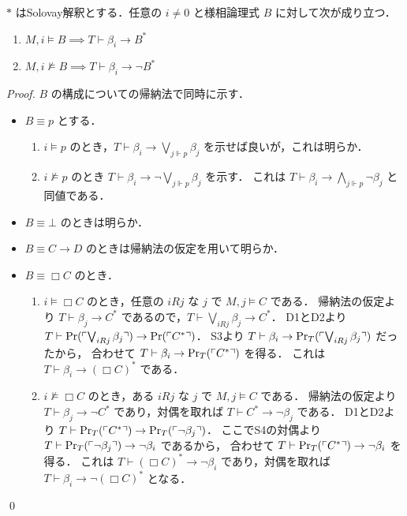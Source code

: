\documentclass{jsarticle}
\begin{document}
\begin{lemma}\label{lem:solovay_interpretation}
	$*$ はSolovay解釈とする．任意の $i \neq 0$ と様相論理式 $B$ に対して次が成り立つ．
	\begin{enumerate}
		\item $M, i \vDash B \implies T \vdash \beta_i \to B^*$
		\item $M, i \nvDash B \implies T \vdash \beta_i \to \lnot B^*$
	\end{enumerate}
\end{lemma}
\begin{proof}
	$B$ の構成についての帰納法で同時に示す．
	\begin{itemize}
		\item
		      $B \equiv p$ とする．
		      \begin{enumerate}
			      \item
			            $i \vDash p$ のとき，$T \vdash \beta_i \to \bigvee_{j \Vdash p} \beta_j $ を示せば良いが，これは明らか．
			      \item
			            $i \nvDash p$ のとき $T \vdash \beta_i \to \lnot \bigvee_{j \Vdash p} \beta_j$ を示す．
			            これは $T \vdash \beta_i \to \bigwedge_{j \Vdash p} \lnot \beta_j$ と同値である．
		      \end{enumerate}
		\item $B \equiv \bot$ のときは明らか．
		\item $B \equiv C \to D$ のときは帰納法の仮定を用いて明らか．
		\item
		      $B \equiv \Box C$ のとき．
		      \begin{enumerate}
			      \item
			            $i \vDash \Box C$ のとき，任意の $i R j$ な $j$ で $M, j \vDash C$ である．
			            帰納法の仮定より $T \vdash \beta_j \to C^*$ であるので，$T \vdash \bigvee_{i R j} \beta_j \to C^*$．
			            D1とD2より $T \vdash \mathrm{Pr}(\ulcorner \bigvee_{i R j} \beta_j \urcorner) \to \mathrm{Pr}(\ulcorner C^* \urcorner)$．
			            S3より $T \vdash \beta_i \to \mathrm{Pr}_T(\ulcorner \bigvee_{i R j} \beta_j \urcorner)$ だったから，
			            合わせて $T \vdash \beta_i \to \mathrm{Pr}_T(\ulcorner C^* \urcorner)$ を得る．
			            これは $T \vdash \beta_i \to (\Box C)^*$ である．
			      \item
			            $i \nvDash \Box C$ のとき，ある $i R j$ な $j$ で $M, j \vDash C$ である．
			            帰納法の仮定より $T \vdash \beta_j \to \lnot C^*$ であり，対偶を取れば $T \vdash C^* \to \lnot \beta_j$ である．
			            D1とD2より $T \vdash \mathrm{Pr}_T(\ulcorner C^* \urcorner) \to \mathrm{Pr}_T(\ulcorner \lnot \beta_j \urcorner)$．
			            ここでS4の対偶より $T \vdash \mathrm{Pr}_T(\ulcorner \lnot \beta_j \urcorner) \to \lnot \beta_i$ であるから，
			            合わせて $T \vdash \mathrm{Pr}_T(\ulcorner C^* \urcorner) \to \lnot \beta_i$ を得る．
			            これは $T \vdash (\Box C)^* \to \lnot \beta_i$ であり，対偶を取れば $T \vdash \beta_i \to \lnot (\Box C)^*$ となる．
		      \end{enumerate}
	\end{itemize}
	\qed
\end{proof}
\end{document}
